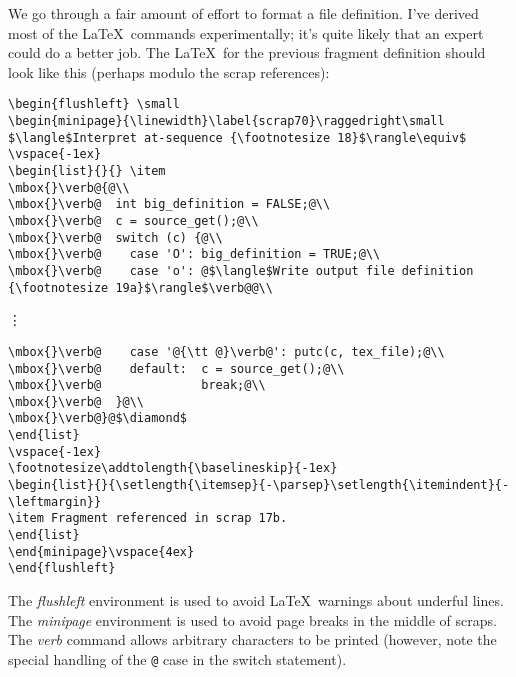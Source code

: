 \documentclass[a4paper]{report}
\begin{document}
We go through a fair amount of effort to format a file definition.
I've derived most of the \LaTeX\ commands experimentally; it's quite
likely that an expert could do a better job. The \LaTeX\ for
the previous fragment definition should look like this (perhaps modulo
the scrap references):
{\small
\begin{verbatim}
\begin{flushleft} \small
\begin{minipage}{\linewidth}\label{scrap70}\raggedright\small
$\langle$Interpret at-sequence {\footnotesize 18}$\rangle\equiv$
\vspace{-1ex}
\begin{list}{}{} \item
\mbox{}\verb@{@\\
\mbox{}\verb@  int big_definition = FALSE;@\\
\mbox{}\verb@  c = source_get();@\\
\mbox{}\verb@  switch (c) {@\\
\mbox{}\verb@    case 'O': big_definition = TRUE;@\\
\mbox{}\verb@    case 'o': @$\langle$Write output file definition {\footnotesize 19a}$\rangle$\verb@@\\
\end{verbatim}
\vdots
\begin{verbatim}
\mbox{}\verb@    case '@{\tt @}\verb@': putc(c, tex_file);@\\
\mbox{}\verb@    default:  c = source_get();@\\
\mbox{}\verb@              break;@\\
\mbox{}\verb@  }@\\
\mbox{}\verb@}@$\diamond$
\end{list}
\vspace{-1ex}
\footnotesize\addtolength{\baselineskip}{-1ex}
\begin{list}{}{\setlength{\itemsep}{-\parsep}\setlength{\itemindent}{-\leftmargin}}
\item Fragment referenced in scrap 17b.
\end{list}
\end{minipage}\vspace{4ex}
\end{flushleft}
\end{verbatim}}

\noindent
The {\em flushleft\/} environment is used to avoid \LaTeX\ warnings
about underful lines. The {\em minipage\/} environment is used to
avoid page breaks in the middle of scraps. The {\em verb\/} command
allows arbitrary characters to be printed (however, note the special
handling of the \verb|@| case in the switch statement).
\end{document}
